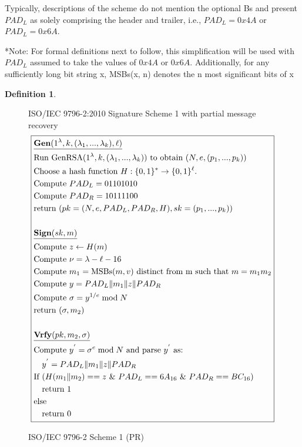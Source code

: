 \documentclass[]{final_report}
\theoremstyle{definition}
\newtheorem{definition}{Definition}[chapter]
\begin{document}
Typically, descriptions of the scheme do not mention the optional Bs and present $PAD_L$ as solely comprising the header and trailer, i.e., $PAD_L = 0x4A$ or $PAD_L = 0x6A$.

*Note: For formal definitions  next to follow, this simplification will be used with $PAD_L$ assumed to take the values of $0x4A$ or $0x6A$. Additionally, for any sufficiently long bit string x, MSBs(x, n) denotes the n most significant bits of x

\begin{definition}
\begin{figure}[H]
\centering
\hfill ISO/IEC 9796-2:2010 Signature Scheme 1 with partial message recovery\hfill\phantom{} 
\[
\boxed{
\begin{aligned}
&\underline{\textbf{\text{Gen}} (1^\lambda, k, (\lambda_{1},...,\lambda_{k}), \ell)} \\
&\text{Run GenRSA}(1^\lambda, k, (\lambda_{1},...,\lambda_{k})) \text{ to obtain } (N, e, (p_{1},...,p_{k})) \\
&\text{Choose a hash function } H : \{0, 1\}^* \rightarrow \{0, 1\}^\ell. \\
&\text{Compute } PAD_{L} = 01101010 \\
&\text{Compute } PAD_{R} = 10111100 \\
&\text{return } (pk = (N, e, PAD_{L}, PAD_{R}, H), sk =  (p_{1},...,p_{k})) \\
\\
&\underline{\textbf{\text{Sign}} (sk, m)} \\
&\text{Compute } z \leftarrow H(m) \\
&\text{Compute } \nu = \lambda - \ell - 16 \\
&\text{Compute } m_{1} = \text{MSBs}(m, v) \text{ distinct from m such that } m = m_{1} m_{2} \\
&\text{Compute } y = PAD_{L} \| m_{1} \| z \| PAD_{R} \\
&\text{Compute } \sigma = y^{1/e} \bmod N \\
&\text{return } (\sigma, m_{2}) \\
\\
&\underline{\textbf{\text{Vrfy}} (pk, m_{2}, \sigma)} \\
&\text{Compute } y^{'} = \sigma^{e} \bmod N \text{ and parse } y^{'} \text{ as: } \\
&\quad y^{'} = PAD_{L} \| m_{1} \| z \| PAD_{R} \\
&\text{If } (H(m_{1} \| m_{2}) == z  \text{ } \& \text{ } PAD_{L} == 6A_{16} \text{ } \& \text{ } PAD_{R} == BC_{16}) \\
&\quad \text{return } 1 \\
&\text{else} \\
&\quad \text{return } 0 
\end{aligned}
}
\]
\caption{ISO/IEC 9796-2 Scheme 1 (PR)}
\label{fig:isoiec9796}
\end{figure}
\end{definition}
\end{document}

